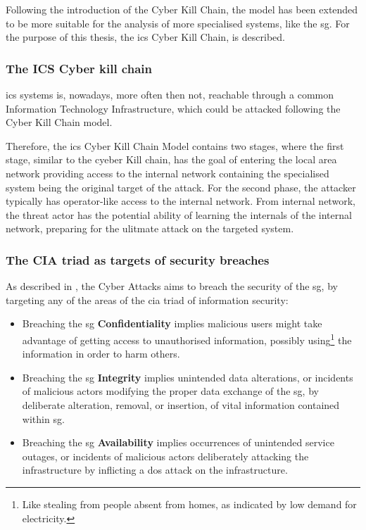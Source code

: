 Following the introduction of the Cyber Kill Chain, the model has been extended to be more suitable for the analysis of more specialised systems, like the \acrshort{sg}.
For the purpose of this thesis, the \acrfull{ics} Cyber Kill Chain, is described.


\subsubsection{The ICS Cyber kill chain}

\acrshort{ics} systems is, nowadays, more often then not, reachable through a common Information Technology Infrastructure, which could be attacked following the Cyber Kill Chain model.

Therefore, the \acrshort{ics} Cyber Kill Chain Model contains two stages, where the first stage, similar to the cyeber Kill chain, has the goal of entering the local area network providing access to the internal network containing the specialised system being the original target of the attack. For the second phase, the attacker typically has operator-like access to the internal network. From internal network, the threat actor has the potential ability of learning the internals of the internal network, preparing for the ulitmate attack on the targeted system.





\subsubsection{The CIA triad  as targets of security breaches}
As described in \cite{rawat2015cyber}, the Cyber Attacks aims to breach the security of the \acrlong{sg}, by targeting any of the areas of  the \acrfull{cia} triad of information security:

\begin{itemize}
    \item Breaching the \acrshort{sg} \textbf{Confidentiality} implies malicious users might take advantage of getting access to unauthorised information, possibly using\footnote{Like stealing from people absent from homes, as indicated by low demand for electricity.} the information in order to harm  others.
    \item Breaching the \acrshort{sg} \textbf{Integrity} implies unintended data alterations, or incidents of malicious actors modifying the proper data exchange of the \acrshort{sg}, by deliberate alteration, removal, or insertion, of vital information contained within \acrfull{sg}. 

 \item Breaching the \acrshort{sg} \textbf{Availability} implies occurrences of unintended service outages, or incidents of malicious actors deliberately attacking the infrastructure by inflicting a \acrfull{dos} attack on the infrastructure.
\end{itemize}


